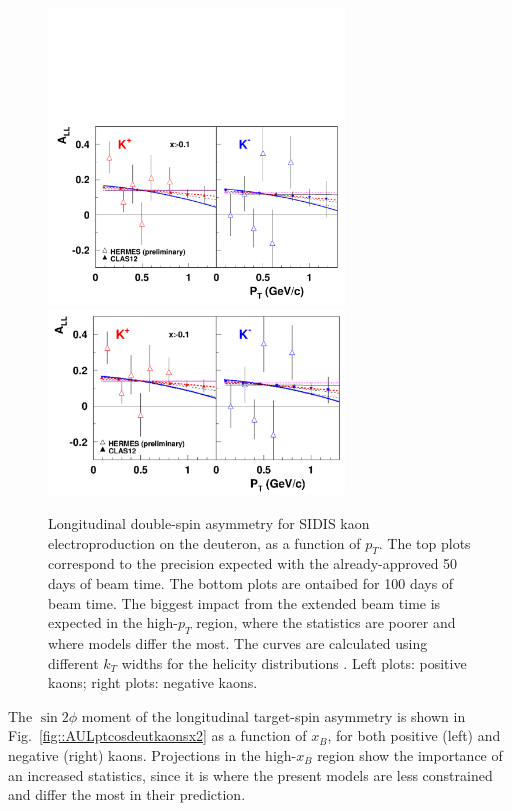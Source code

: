 %
\begin{figure}
\centering
\includegraphics[width=0.7\textwidth]{sidis/allpt11deutkaonbakur-eps-converted-to.pdf}
\includegraphics[width=0.7\textwidth]{sidis/all_kaons_x2.pdf}
\caption{\label{fig::ALLptcosdeutkaonsx2} Longitudinal double-spin asymmetry for SIDIS kaon electroproduction on the deuteron, as a function of $p_T$. The top plots correspond to the precision expected with the already-approved 50 days of beam time. The bottom plots are ontaibed for 100 days of beam time. The biggest impact from the extended beam time is expected in the high-$p_T$ region, where the statistics are poorer and where models differ the most. The curves are calculated using different $k_T$ widths for the helicity distributions \cite{torino_models}. Left plots: positive kaons; right plots: negative kaons.}
\end{figure}
%
%
The $\sin2\phi$ moment of the longitudinal target-spin asymmetry is shown in Fig.~\ref{fig::AULptcosdeutkaonsx2} as a function of $x_B$, for both positive (left) and negative (right) kaons. Projections in the high-$x_B$ region show the importance of an increased statistics, since it is where the present models are less constrained and differ the most in their prediction. 
